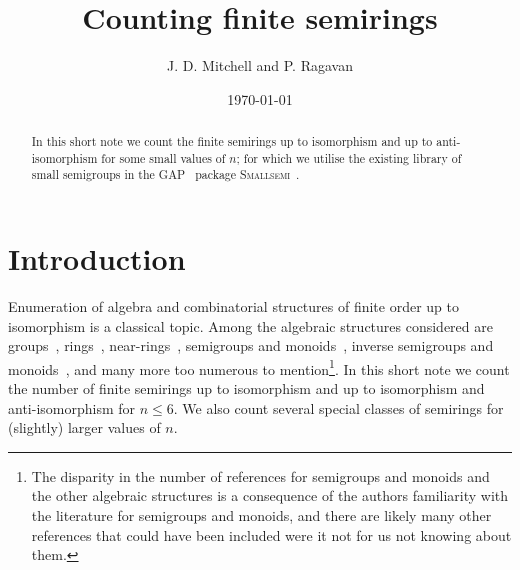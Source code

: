\documentclass{article}
\title{Counting finite semirings}
\author{J. D. Mitchell and P. Ragavan}
\date{\today}
\theoremstyle{definition}
\theoremstyle{plain}
\newcommand{\GAP}{\textsc{GAP}~\cite{GAP4}\xspace}
\newcommand{\Smallsemi}{\textsc{Smallsemi}~\cite{Smallsemi}\xspace}
\begin{document}
\maketitle

\begin{abstract}
  In this short note we count the finite semirings up to isomorphism
  and up to anti-isomorphism for some small values of $n$; for which we
  utilise the existing library of small semigroups in the \GAP
  package \Smallsemi.
\end{abstract}

\section{Introduction}

Enumeration of algebra and combinatorial structures of finite order up to
isomorphism is a classical topic. Among the algebraic structures considered are
groups~\cite{BESCHE2002,A000001}, rings~\cite{Blackburn2022, Fine1993,
Kruse1970, A027623}, near-rings~\cite{Chow2024, SONATA, A305858},
semigroups and monoids~\cite{Distler2010, Distler2010, Distler2013,
  Forsythe1955, Grillet1996, Grillet2014, Jrgensen1977, Motzkin1955,
Plemmons1967, A027851, A058129, Satoh1994, A001426, A001423},
inverse semigroups and monoids~\cite{Malandro2019, A001428, A234843,
A234844, A234845}, and many more too numerous to mention\footnote{The disparity
  in the number of references for semigroups and monoids and the other
  algebraic structures is a consequence of the authors familiarity with the
  literature for semigroups and monoids, and there are likely many other
  references that could have been included were it not for us not knowing about
them.}. In this short note we count the number of finite semirings up to
isomorphism and up to isomorphism and anti-isomorphism for $n \leq 6$. We also
count several special classes of semirings for (slightly) larger values of $n$.
\end{document}
